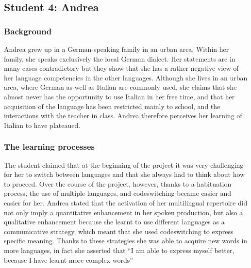 \documentclass[output=paper]{../langscibook}
\begin{document}
\subsection{Student 4: Andrea}
\subsubsection{Background}
Andrea grew up in a German-speaking family in an urban area. Within her family, she speaks exclusively the local German dialect. Her statements are in many cases contradictory but they show that she has a rather negative view of her language competencies in the other languages. Although she lives in an urban area, where German as well as Italian are commonly used, she claims that she almost never has the opportunity to use Italian in her free time, and that her acquisition of the language has been restricted mainly to school, and the interactions with the teacher in class. Andrea therefore perceives her learning of Italian to have plateaued.

\subsubsection{The learning processes}

The student claimed that at the beginning of the project it was very challenging for her to switch between languages and that she always had to think about how to proceed. Over the course of the project, however, thanks to a habituation process, the use of multiple languages, and codeswitching became easier and easier for her. Andrea stated that the activation of her multilingual repertoire did not only imply a quantitative enhancement in her spoken production, but also a qualitative enhancement because she learnt to use different languages as a communicative strategy, which meant that she used codeswitching to express specific meaning. Thanks to these strategies she was able to acquire new words in more languages, in fact she asserted that “I am able to express myself better, because I have learnt more complex words”
\end{document}
